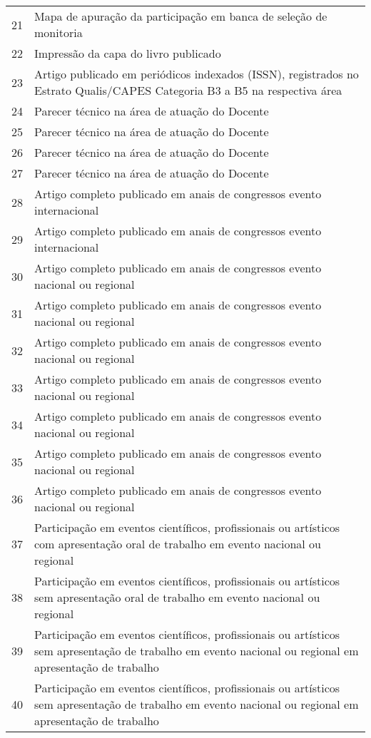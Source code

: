 \documentclass[a4paper,oneside,10pt]{article}
\begin{document}
{\begin{longtable}[H]{@{} r P{8cm} @{}}
21 & {Mapa de apuração da participação em banca de seleção de monitoria}\\
22 & {Impressão da capa do livro publicado}\\
23 & {Artigo publicado em periódicos indexados (ISSN), registrados no Estrato Qualis/CAPES Categoria B3 a B5 na respectiva área}\\
24 & {Parecer técnico na área de atuação do Docente}\\
25 & {Parecer técnico na área de atuação do Docente}\\
26 & {Parecer técnico na área de atuação do Docente}\\
27 & {Parecer técnico na área de atuação do Docente }\\
28 & {Artigo completo publicado em anais de congressos evento internacional}\\
29 & {Artigo completo publicado em anais de congressos evento internacional}\\
30 & {Artigo completo publicado em anais de congressos evento nacional ou regional}\\
31 & {Artigo completo publicado em anais de congressos evento nacional ou regional}\\
32 & {Artigo completo publicado em anais de congressos evento nacional ou regional}\\
33 & {Artigo completo publicado em anais de congressos evento nacional ou regional}\\
34 & {Artigo completo publicado em anais de congressos evento nacional ou regional}\\
35 & {Artigo completo publicado em anais de congressos evento nacional ou regional}\\
36 & {Artigo completo publicado em anais de congressos evento nacional ou regional}\\
37 & {Participação em eventos científicos, profissionais ou artísticos com apresentação oral de trabalho em evento nacional ou regional}\\
38 & {Participação em eventos científicos, profissionais ou artísticos sem apresentação oral de trabalho em evento nacional ou regional}\\
39 & {Participação em eventos científicos, profissionais ou artísticos sem apresentação de trabalho em evento nacional ou regional em apresentação de trabalho}\\ 
40 & {Participação em eventos científicos, profissionais ou artísticos sem apresentação de trabalho em evento nacional ou regional em apresentação de trabalho}\\

\end{longtable}}
\end{document}
